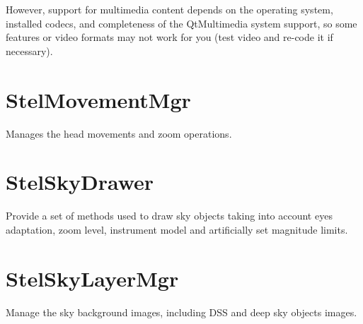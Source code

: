 However, support for multimedia content depends on the operating system, installed codecs, and completeness of the QtMultimedia system support, so some features or video formats may not work for you (test video and re-code it if necessary).

\section{StelMovementMgr}
\label{sec:ScriptingAPI:StelMovementMgr}

Manages the head movements and zoom operations.

\section{StelSkyDrawer}
\label{sec:ScriptingAPI:StelSkyDrawer}

Provide a set of methods used to draw sky objects taking into account eyes adaptation, zoom level, instrument model and artificially set magnitude limits.

\section{StelSkyLayerMgr}
\label{sec:ScriptingAPI:StelSkyLayerMgr}

Manage the sky background images, including DSS and deep sky objects images.
